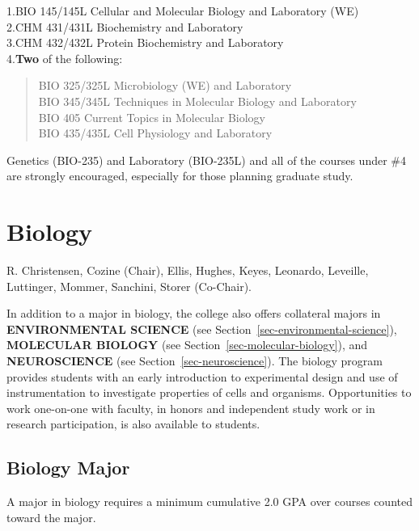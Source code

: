 \documentclass[
  letterpaper,
]{scrbook}
\begin{document}
1.BIO 145/145L Cellular and Molecular Biology and Laboratory (WE)\\
2.CHM 431/431L Biochemistry and Laboratory\\
3.CHM 432/432L Protein Biochemistry and Laboratory\\
4.\textbf{Two} of the following:

\begin{quote}
BIO 325/325L Microbiology (WE) and Laboratory\\
BIO 345/345L Techniques in Molecular Biology and Laboratory\\
BIO 405 Current Topics in Molecular Biology\\
BIO 435/435L Cell Physiology and Laboratory
\end{quote}

Genetics (BIO-235) and Laboratory (BIO-235L) and all of the courses
under \#4 are strongly encouraged, especially for those planning
graduate study.

\section{Biology}\label{sec-biology}

R. Christensen, Cozine (Chair), Ellis, Hughes, Keyes, Leonardo,
Leveille, Luttinger, Mommer, Sanchini, Storer (Co-Chair).

In addition to a major in biology, the college also offers collateral
majors in \textbf{ENVIRONMENTAL SCIENCE} (see
Section~\ref{sec-environmental-science}), \textbf{MOLECULAR BIOLOGY}
(see Section~\ref{sec-molecular-biology}), and \textbf{NEUROSCIENCE}
(see Section~\ref{sec-neuroscience}). The biology program provides
students with an early introduction to experimental design and use of
instrumentation to investigate properties of cells and organisms.
Opportunities to work one-on-one with faculty, in honors and independent
study work or in research participation, is also available to students.

\subsection{Biology Major}\label{biology-major}

A major in biology requires a minimum cumulative 2.0 GPA over courses
counted toward the major.
\end{document}

